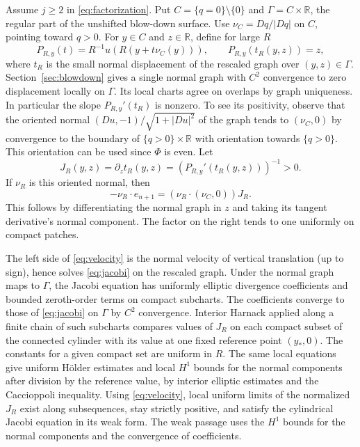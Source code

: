 \documentclass[11pt]{amsart}
\begin{document}
Assume \(j\ge2\) in \eqref{eq:factorization}. Put \(C=\{q=0\}\setminus\{0\}\) and
\(\Gamma=C\times\mathbb R\), the regular part of the unshifted
blow-down surface. Use \(\nu_C=Dq/|Dq|\) on \(C\), pointing toward
\(q>0\). For \(y\in C\) and \(z\in\mathbb R\), define for large \(R\)
\begin{equation}\label{eq:graph}
 P_{R,y}(t)=R^{-1}u(R(y+t\nu_C(y))),\qquad
 P_{R,y}(t_R(y,z))=z,
\end{equation}
where \(t_R\) is the small normal displacement of the rescaled graph
over \((y,z)\in\Gamma\). Section~\ref{sec:blowdown} gives a single normal graph with
\(C^2\) convergence to zero displacement locally on \(\Gamma\).
Its local charts agree on overlaps by graph uniqueness. In
particular the slope \(P_{R,y}'(t_R)\) is nonzero. To see its positivity, observe that the oriented normal \((Du,-1)/\sqrt{1+|Du|^2}\) of the graph tends
to \((\nu_C,0)\) by convergence to the boundary of \(\{q>0\}\times
\mathbb R\) with orientation towards \(\{q>0\}\). This orientation
can be used since \(\Phi\) is even. Let
\[
 J_R(y,z)=\partial_z t_R(y,z)=(P_{R,y}'(t_R(y,z)))^{-1}>0.
\]
If \(\nu_R\) is this oriented normal, then
\begin{equation}\label{eq:velocity}
 -\nu_R\cdot e_{n+1}
    =(\nu_R\cdot(\nu_C,0))J_R.
\end{equation}
This follows by differentiating the normal graph in \(z\) and
taking its tangent derivative's normal component. The factor on
the right tends to one uniformly on compact patches.

The left side of \eqref{eq:velocity} is the normal velocity of vertical translation
(up to sign), hence solves \eqref{eq:jacobi} on the rescaled graph. Under the
normal graph maps to \(\Gamma\), the Jacobi equation has uniformly
elliptic divergence coefficients and bounded zeroth-order terms
on compact subcharts. The coefficients converge to those of \eqref{eq:jacobi}
on \(\Gamma\) by \(C^2\) convergence. Interior Harnack applied
along a finite chain of such subcharts compares values of \(J_R\)
on each compact subset of the connected cylinder with its value
at one fixed reference point \((y_*,0)\). The constants for a
given compact set are uniform in \(R\). The same local equations
give uniform H\"older estimates and local \(H^1\) bounds for the
normal components after division by the reference value,
by interior elliptic estimates and the Caccioppoli inequality.
Using \eqref{eq:velocity}, local uniform limits of the normalized \(J_R\) exist
along subsequences, stay strictly positive, and satisfy the
cylindrical Jacobi equation in its weak form. The weak passage
uses the \(H^1\) bounds for the normal components and the
convergence of coefficients.
\end{document}
